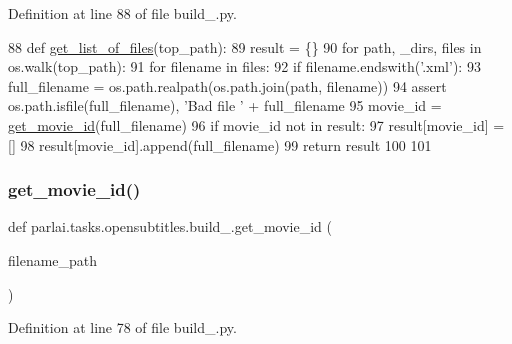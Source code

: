 Definition at line 88 of file build\+\_.\+py.


\begin{DoxyCode}
88 \textcolor{keyword}{def }\hyperlink{namespaceparlai_1_1tasks_1_1opensubtitles_1_1build__2018_a9e74d36a72b56738f45b2dda7a867d46}{get\_list\_of\_files}(top\_path):
89     result = \{\}
90     \textcolor{keywordflow}{for} path, \_dirs, files \textcolor{keywordflow}{in} os.walk(top\_path):
91         \textcolor{keywordflow}{for} filename \textcolor{keywordflow}{in} files:
92             \textcolor{keywordflow}{if} filename.endswith(\textcolor{stringliteral}{'.xml'}):
93                 full\_filename = os.path.realpath(os.path.join(path, filename))
94                 \textcolor{keyword}{assert} os.path.isfile(full\_filename), \textcolor{stringliteral}{'Bad file '} + full\_filename
95                 movie\_id = \hyperlink{namespaceparlai_1_1tasks_1_1opensubtitles_1_1build__2018_a6f66d00bdef41302d4c072958f8758a2}{get\_movie\_id}(full\_filename)
96                 \textcolor{keywordflow}{if} movie\_id \textcolor{keywordflow}{not} \textcolor{keywordflow}{in} result:
97                     result[movie\_id] = []
98                 result[movie\_id].append(full\_filename)
99     \textcolor{keywordflow}{return} result
100 
101 
\end{DoxyCode}
\mbox{\label{namespaceparlai_1_1tasks_1_1opensubtitles_1_1build__2018_a6f66d00bdef41302d4c072958f8758a2}} 
\subsubsection{\texorpdfstring{get\+\_\+movie\+\_\+id()}{get\_movie\_id()}}
{\footnotesize\ttfamily def parlai.\+tasks.\+opensubtitles.\+build\+\_.\+get\+\_\+movie\+\_\+id (\begin{DoxyParamCaption}\item[{}]{filename\+\_\+path }\end{DoxyParamCaption})}



Definition at line 78 of file build\+\_.\+py.


